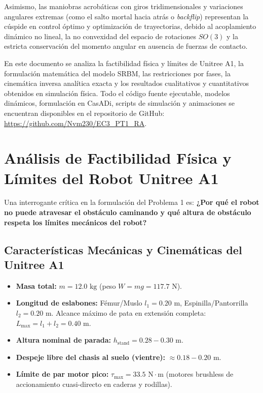 \documentclass[11pt,a4paper]{article}
\begin{document}
Asimismo, las maniobras acrobáticas con giros tridimensionales y variaciones angulares extremas (como el salto mortal hacia atrás o \textit{backflip}) representan la cúspide en control óptimo y optimización de trayectorias, debido al acoplamiento dinámico no lineal, la no convexidad del espacio de rotaciones $SO(3)$ y la estricta conservación del momento angular en ausencia de fuerzas de contacto.

En este documento se analiza la factibilidad física y límites de Unitree A1, la formulación matemática del modelo SRBM, las restricciones por fases, la cinemática inversa analítica exacta y los resultados cualitativos y cuantitativos obtenidos en simulación física. Todo el código fuente ejecutable, modelos dinámicos, formulación en CasADi, scripts de simulación y animaciones se encuentran disponibles en el repositorio de GitHub: \url{https://github.com/Nvm230/EC3_PT1_RA}.

\section{Análisis de Factibilidad Física y Límites del Robot Unitree A1}
Una interrogante crítica en la formulación del Problema 1 es: \textbf{¿Por qué el robot no puede atravesar el obstáculo caminando y qué altura de obstáculo respeta los límites mecánicos del robot?}

\subsection{Características Mecánicas y Cinemáticas del Unitree A1}
\begin{itemize}
    \item \textbf{Masa total:} $m = 12.0\text{ kg}$ (peso $W = mg = 117.7\text{ N}$).
    \item \textbf{Longitud de eslabones:} Fémur/Muslo $l_1 = 0.20\text{ m}$, Espinilla/Pantorrilla $l_2 = 0.20\text{ m}$. Alcance máximo de pata en extensión completa: $L_{\max} = l_1 + l_2 = 0.40\text{ m}$.
    \item \textbf{Altura nominal de parada:} $h_{\text{stand}} = 0.28 - 0.30\text{ m}$.
    \item \textbf{Despeje libre del chasis al suelo (vientre):} $\approx 0.18 - 0.20\text{ m}$.
    \item \textbf{Límite de par motor pico:} $\tau_{\max} = 33.5\text{ N}\cdot\text{m}$ (motores brushless de accionamiento cuasi-directo en caderas y rodillas).
\end{itemize}
\end{document}
